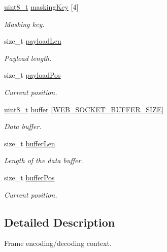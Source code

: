 \begin{DoxyCompactItemize}
\hyperlink{stdint_8h_aba7bc1797add20fe3efdf37ced1182c5}{uint8\+\_\+t} \hyperlink{structWebSocketFrameContext_aed0e3efec712dcb1c747dad97187d0ad}{masking\+Key} \mbox{[}4\mbox{]}
\begin{DoxyCompactList}\small\item\em Masking key. \end{DoxyCompactList}\item 
size\+\_\+t \hyperlink{structWebSocketFrameContext_a55076f17b7463a67c6e07cbd2de8d241}{payload\+Len}
\begin{DoxyCompactList}\small\item\em Payload length. \end{DoxyCompactList}\item 
size\+\_\+t \hyperlink{structWebSocketFrameContext_a41d8ddb620bef6087c9806318db79f3f}{payload\+Pos}
\begin{DoxyCompactList}\small\item\em Current position. \end{DoxyCompactList}\item 
\hyperlink{stdint_8h_aba7bc1797add20fe3efdf37ced1182c5}{uint8\+\_\+t} \hyperlink{structWebSocketFrameContext_a3cec5a6cbb2cf4c3d519ddecae1f4726}{buffer} \mbox{[}\hyperlink{web__socket_8h_a4e6ed74586f83eedc4eae5a079f41050}{W\+E\+B\+\_\+\+S\+O\+C\+K\+E\+T\+\_\+\+B\+U\+F\+F\+E\+R\+\_\+\+S\+I\+ZE}\mbox{]}
\begin{DoxyCompactList}\small\item\em Data buffer. \end{DoxyCompactList}\item 
size\+\_\+t \hyperlink{structWebSocketFrameContext_ac89d1a88498690e3ae1f39c96182ea19}{buffer\+Len}
\begin{DoxyCompactList}\small\item\em Length of the data buffer. \end{DoxyCompactList}\item 
size\+\_\+t \hyperlink{structWebSocketFrameContext_acad756853cbb653f12d4fd64bbf4cf0a}{buffer\+Pos}
\begin{DoxyCompactList}\small\item\em Current position. \end{DoxyCompactList}\end{DoxyCompactItemize}


\subsection{Detailed Description}
Frame encoding/decoding context. 


